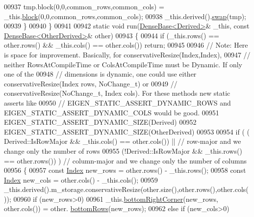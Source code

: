\begin{DoxyCode}
00937       tmp.block(0,0,common\_rows,common\_cols) = \_this.\hyperlink{group___core___module_ab8e42e67c5cfd5fa13e684642f0f65bf}{block}(0,0,common\_rows,common\_cols);
00938       \_this.derived().\hyperlink{group___core___module_ab420d9d588ac443f5a1b1a7dceb12c90}{swap}(tmp);
00939     \}
00940   \}
00941 
00942   \textcolor{keyword}{static} \textcolor{keywordtype}{void} run(\hyperlink{group___core___module_class_eigen_1_1_dense_base}{DenseBase<Derived>}& \_this, \textcolor{keyword}{const} 
      \hyperlink{group___core___module_class_eigen_1_1_dense_base}{DenseBase<OtherDerived>}& other)
00943   \{
00944     \textcolor{keywordflow}{if} (\_this.rows() == other.rows() && \_this.cols() == other.cols()) \textcolor{keywordflow}{return};
00945 
00946     \textcolor{comment}{// Note: Here is space for improvement. Basically, for conservativeResize(Index,Index),}
00947     \textcolor{comment}{// neither RowsAtCompileTime or ColsAtCompileTime must be Dynamic. If only one of the}
00948     \textcolor{comment}{// dimensions is dynamic, one could use either conservativeResize(Index rows, NoChange\_t) or}
00949     \textcolor{comment}{// conservativeResize(NoChange\_t, Index cols). For these methods new static asserts like}
00950     \textcolor{comment}{// EIGEN\_STATIC\_ASSERT\_DYNAMIC\_ROWS and EIGEN\_STATIC\_ASSERT\_DYNAMIC\_COLS would be good.}
00951     EIGEN\_STATIC\_ASSERT\_DYNAMIC\_SIZE(Derived)
00952     EIGEN\_STATIC\_ASSERT\_DYNAMIC\_SIZE(OtherDerived)
00953 
00954     \textcolor{keywordflow}{if} ( ( Derived::IsRowMajor && \_this.cols() == other.cols()) || \textcolor{comment}{// row-major and we change only the
       number of rows}
00955          (!Derived::IsRowMajor && \_this.rows() == other.rows()) )  \textcolor{comment}{// column-major and we change only the
       number of columns}
00956     \{
00957       \textcolor{keyword}{const} \hyperlink{namespace_eigen_a62e77e0933482dafde8fe197d9a2cfde}{Index} new\_rows = other.rows() - \_this.rows();
00958       \textcolor{keyword}{const} \hyperlink{namespace_eigen_a62e77e0933482dafde8fe197d9a2cfde}{Index} new\_cols = other.cols() - \_this.cols();
00959       \_this.derived().m\_storage.conservativeResize(other.size(),other.rows(),other.cols());
00960       \textcolor{keywordflow}{if} (new\_rows>0)
00961         \_this.\hyperlink{group___core___module_a6cdf27f6b825097f86fc6bcdbeed9e65}{bottomRightCorner}(new\_rows, other.cols()) = other.
      \hyperlink{group___core___module_acff625e5f44ffe92bf79d20223114c2d}{bottomRows}(new\_rows);
00962       \textcolor{keywordflow}{else} \textcolor{keywordflow}{if} (new\_cols>0)

\end{DoxyCode}
